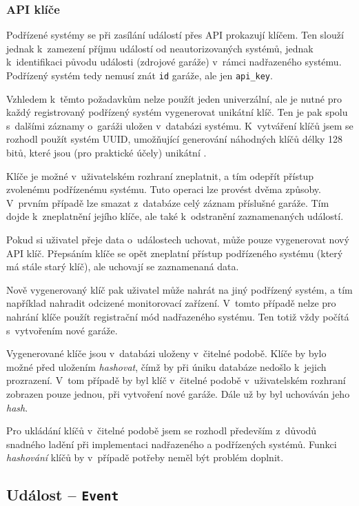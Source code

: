 \subsubsection{API klíče}
\label{sec:de_apikeys}

Podřízené systémy se při zasílání událostí přes API prokazují klíčem. Ten slouží jednak k~zamezení příjmu událostí od neautorizovaných systémů, jednak k~identifikaci původu události (zdrojové garáže) v~rámci nadřazeného systému. Podřízený systém tedy nemusí znát \texttt{id} garáže, ale jen \texttt{api\_key}.

Vzhledem k~těmto požadavkům nelze použít jeden univerzální, ale je nutné pro každý registrovaný podřízený systém vygenerovat unikátní klíč. Ten je pak spolu s~dalšími záznamy o~garáži uložen v~databázi systému. K~vytváření klíčů jsem se rozhodl použít systém UUID, umožňující generování náhodných klíčů délky 128 bitů, které jsou (pro praktické účely) unikátní \cite{rfc4122}.

Klíče je možné v~uživatelském rozhraní zneplatnit, a tím odepřít přístup zvolenému podřízenému systému. Tuto operaci lze provést dvěma způsoby. V~prvním případě lze smazat z~databáze celý záznam příslušné garáže. Tím dojde k~zneplatnění jejího klíče, ale také k~odstranění zaznamenaných událostí.

Pokud si uživatel přeje data o~událostech uchovat, může pouze vygenerovat nový API klíč. Přepsáním klíče se opět zneplatní přístup podřízeného systému (který má stále starý klíč), ale uchovají se zaznamenaná data. 

Nově vygenerovaný klíč pak uživatel může nahrát na jiný podřízený systém, a tím například nahradit odcizené monitorovací zařízení. V~tomto případě nelze pro nahrání klíče použít registrační mód nadřazeného systému. Ten totiž vždy počítá s~vytvořením nové garáže.

Vygenerované klíče jsou v~databázi uloženy v~čitelné podobě. Klíče by bylo možné před uložením \textit{hashovat}, čímž by při úniku databáze nedošlo k~jejich prozrazení. V~tom případě by byl klíč v~čitelné podobě v~uživatelském rozhraní zobrazen pouze jednou, při vytvoření nové garáže. Dále už by byl uchováván jeho \textit{hash}.

Pro ukládání klíčů v~čitelné podobě jsem se rozhodl především z~důvodů snadného ladění při implementaci nadřazeného a podřízených systémů. Funkci \textit{hashování} klíčů by v~případě potřeby neměl být problém doplnit.

\subsection{Událost -- \texttt{Event}}
\label{sec:de_event}

